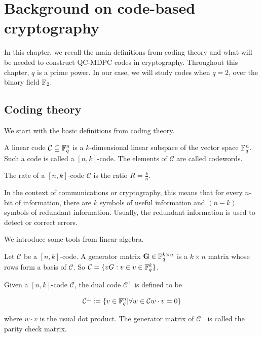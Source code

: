 \section{Background on code-based cryptography}

In this chapter, we recall the main definitions from coding theory and what will be needed to construct QC-MDPC codes in cryptography. Throughout this chapter, $q$ is a prime power. In our case, we will study codes when $q=2$, over the binary field $\mathbb{F}_2$.

\subsection{Coding theory}
We start with the basic definitions from coding theory.

\begin{defn}
A linear code $\mathcal{C} \subseteq \mathbb{F}_q^n$ is a $k$-dimensional linear subspace of the vector space $\mathbb{F}_q^n$. Such a code is called a $[n,k]$-code. The elements of $\mathcal{C}$ are called codewords.
\end{defn}

\begin{defn}
The rate of a $[n,k]$-code $\mathcal{C}$ is the ratio $ R = \frac{k}{n}$.

In the context of communications or cryptography, this means that for every $n$-bit of information, there are $k$ symbols of useful information and $(n-k)$ symbols of redundant information. Usually, the redundant information is used to detect or correct errors.
\end{defn}

We introduce some tools from linear algebra.

\begin{defn}
Let $\mathcal{C}$ be a $[n,k]$-code. A generator matrix $\mathbf{G} \in \mathbb{F}_q^{k \times n}$ is a $k \times n$ matrix whose rows form a basis of $\mathcal{C}$. So $\mathcal{C} = \{ vG: v \in v \in \mathbb{F}_q^k\}$.
\end{defn}

\begin{defn}
Given a $[n,k]$-code $\mathcal{C}$, the dual code $\mathcal{C}^\perp$ is defined to be

\[
\mathcal{C}^\perp := \{ v \in \mathbb{F}_q^n | \forall w \in \mathcal{C} w \cdot v = 0 \}   
\]

where $ w \cdot v $ is the usual dot product. The generator matrix of $\mathcal{C}^\perp$ is called the parity check matrix.
\end{defn}


